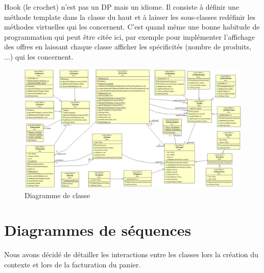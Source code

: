 \documentclass{article}
\begin{document}
{
Hook (le crochet) n'est pas un DP mais un idiome. Il consiste à définir une méthode template dans
la classe du haut et à laisser les sous-classes redéfinir les méthodes virtuelles qui les
concernent. C'est quand même une bonne habitude de programmation qui peut être citée ici,
par exemple pour implémenter l'affichage des offres en laissant chaque classe afficher les
spécificités (nombre de produits, ...) qui les concernent.
}

\begin{figure}
	\vfill\hfill %
	\includegraphics[scale=0.36]{diagUML.png}
	\hfill\vfill %
	\caption{Diagramme de classe}
\end{figure}

\clearpage %

\section*{Diagrammes de séquences}

Nous avons décidé de détailler les interactions entre les classes lors la création du contexte et lors de la facturation du panier.
\end{document}
